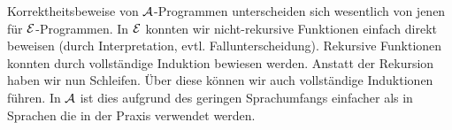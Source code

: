 {\begin{comment}
\intertext{\textcolor{darkblue}{NE: $\omega^{3} \sim_{\tu{y}} \omega^{2}$ und berechnen
$\omega^{3}(\tu{y})
=\I{T}{\omega^{2}}{minus(y,eins)}$\newline$
=\text{minus}(\I{T}{\omega^{2}}{y},\I{T}{\omega^{2}}{eins})
=\text{minus}(\omega^{2}(\u{y}),1)
=\text{minus}(2,1)
=1$}}
&= \Iu{A}{\omega^{3}}{\tu{while \tneg eq?(y,null) do} \; Z_{4,5,6,7}} \\
\intertext{\textcolor{darkblue}{NR: $\I{P}{\omega^{3}}{\tneg eq?(y,null)}
=\tneg \I{P}{\omega^{3}}{eq?(y,null)}
=\tneg \text{eq?}\rbr{\I{T}{\omega^{3}}{y},\I{T}{\omega^{1}}{null}}$\newline$
=\tneg \text{eq?}\rbr{\omega^{3}(\tu{y}),0}
=\tneg \text{eq?}\rbr{1,0}
=\tneg F
=T$}}
&= \Iu{A}{\I{A}{\omega^{3}}{\small begin z := plus(z,x) ; y := minus(y,eins) end}}{\tu{\footnotesize while \tneg eq?(y,null) do} \; Z_{4,5,6,7}} \\
&= \Iu{A}{\I{A}{\I{A}{\omega^{3}}{z := plus(z,x)}}{y := minus(y,eins)}}{\tu{\footnotesize while \tneg eq?(y,null) do} \; Z_{4,5,6,7}} \\
\intertext{\textcolor{darkblue}{NE: $\omega^{4} \sim_{\tu{z}} \omega^{3}$ und berechnen
$\omega^{4}(\tu{z})
=\I{T}{\omega^{3}}{plus(z,x)}
=\text{plus}(\I{T}{\omega^{3}}{z},\I{T}{\omega^{3}}{x})$\newline$
=\text{plus}(\omega^{3}(\u{z}),\omega^{3}(\u{x}))
=\text{plus}(3,3)
=6$}}
&= \Iu{A}{\I{A}{\omega^{4}}{y := minus(y,eins)}}{\tu{while \tneg eq?(y,null) do} \; Z_{4,5,6,7}} \\
\intertext{\textcolor{darkblue}{NE: $\omega^{5} \sim_{\tu{y}} \omega^{4}$ und berechnen
$\omega^{5}(\tu{y})
=\I{T}{\omega^{4}}{minus(y,eins)}$\newline$
=\text{minus}(\I{T}{\omega^{4}}{y},\I{T}{\omega^{4}}{eins})
=\text{minus}(\omega^{4}(\u{y}),1)
=\text{minus}(1,1)
=0$}}
&= \Iu{A}{\omega^{5}}{\tu{while \tneg eq?(y,null) do} \; Z_{4,5,6,7}} \\
\intertext{\textcolor{darkblue}{NR: $\I{P}{\omega^{5}}{\tneg eq?(y,null)}
=\tneg \I{P}{\omega^{5}}{eq?(y,null)}
=\tneg \text{eq?}\rbr{\I{T}{\omega^{5}}{y},\I{T}{\omega^{5}}{null}}$\newline$
=\tneg \text{eq?}\rbr{\omega^{5}(\tu{y}),0}
=\tneg \text{eq?}\rbr{0,0}
=\tneg T
=F$}}
&= \omega^{(5)}
\end{align*}
\end{bsp}
\ifthenelse{\boolean{long}}{}{\end{comment}}

Korrektheitsbeweise von $\mathcal{A}$-Programmen unterscheiden sich wesentlich von
jenen für $\mathcal{E}$-Programmen. In $\mathcal{E}$ konnten wir nicht-rekursive Funktionen
einfach direkt beweisen (durch Interpretation, evtl. Fallunterscheidung). Rekursive
Funktionen konnten durch vollständige Induktion bewiesen werden. Anstatt der Rekursion
haben wir nun Schleifen. Über diese können wir auch vollständige Induktionen führen.
In $\mathcal{A}$ ist dies aufgrund des geringen Sprachumfangs einfacher als
in Sprachen die in der Praxis verwendet werden.


